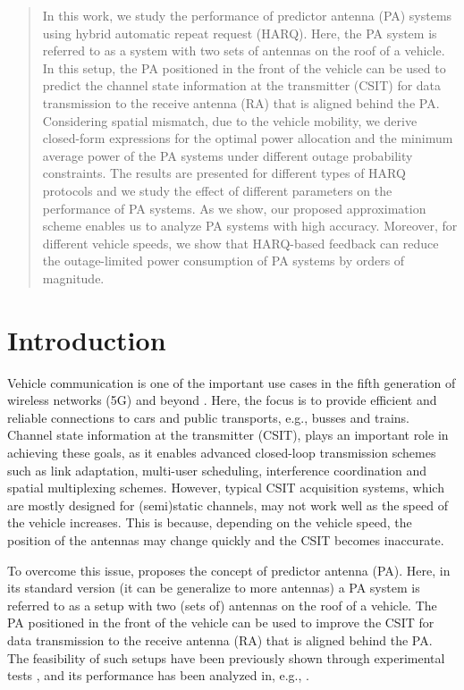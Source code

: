 \begin{abstract}
In this work, we study the performance of predictor antenna (PA) systems using hybrid automatic repeat request (HARQ). Here, the PA system is referred to as a system with two sets of antennas on the roof of a vehicle. In this setup, the PA positioned in the front of the vehicle can be used to predict the channel state information at the transmitter (CSIT) for data transmission to the receive antenna (RA) that is aligned behind the PA. Considering spatial mismatch, due to the vehicle mobility, we derive closed-form expressions for the optimal power allocation and the minimum average power of the PA systems under different outage probability constraints. The results are presented for different types of HARQ protocols and we study the effect of different parameters on the performance of PA systems. As we show, our proposed approximation scheme enables us to analyze PA systems with high accuracy. Moreover, for different vehicle speeds, we show that HARQ-based feedback can reduce the outage-limited power consumption of PA systems by orders of magnitude.
\end{abstract}


\section{Introduction}
Vehicle communication is one of the important use cases in the fifth generation of wireless networks (5G) and beyond \cite{Dang2020what}.  Here, the focus is to provide efficient and reliable connections to cars and public transports, e.g., busses and trains. Channel state information at the transmitter (CSIT), plays an important role in achieving these goals, as it enables advanced closed-loop transmission schemes such as link adaptation, multi-user scheduling, interference coordination and spatial multiplexing schemes.  However,  typical CSIT acquisition systems, which are mostly designed for (semi)static channels, may not work well as the speed of the vehicle increases. This is because, depending on the vehicle speed, the position of the antennas may change quickly and the CSIT becomes inaccurate. 

To overcome this issue, \cite{Sternad2012WCNCWusing} proposes the concept of predictor antenna (PA).  Here, in its standard version (it can be generalize to more antennas) a  PA system is referred to as a setup with two (sets of) antennas on the roof of a vehicle. The PA positioned in the front of the vehicle can be used to improve the CSIT for data transmission to the receive antenna (RA) that is aligned behind the PA. The feasibility of such setups have been previously shown through experimental tests \cite{Sternad2012WCNCWusing,DT2015ITSMmaking}, and its performance has been analyzed in, e.g., \cite{Jamaly2019IETeffects,Guo2019WCLrate,guo2020semilinear}. 


